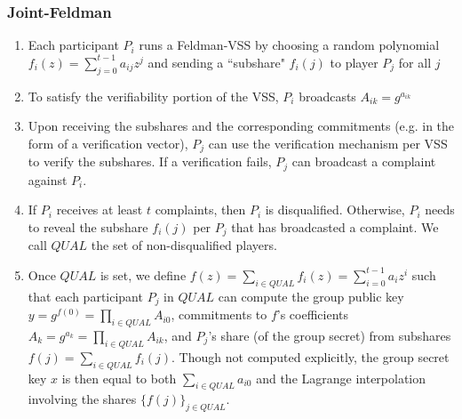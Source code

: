 \documentclass[11pt]{article}
\theoremstyle{definition}
\theoremstyle{remark}
\begin{document}
\subsubsection{Joint-Feldman}
\begin{enumerate}
\item Each participant $P_i$ runs a Feldman-VSS by choosing a random polynomial $f_i(z) = \sum_{j = 0}^{t - 1} a_{ij} z^j$ and sending a ``subshare" $f_i(j)$ to player $P_j$ for all $j$
\item To satisfy the verifiability portion of the VSS, $P_i$ broadcasts $A_{ik} = g^{a_{ik}}$
\item Upon receiving the subshares and the corresponding commitments (e.g. in the form of a verification vector), $P_j$ can use the verification mechanism per VSS to verify the subshares. If a verification fails, $P_j$ can broadcast a complaint against $P_i$.
\item If $P_i$ receives at least $t$ complaints, then $P_i$ is disqualified. Otherwise, $P_i$ needs to reveal the subshare $f_i(j)$ per $P_j$ that has broadcasted a complaint. We call $QUAL$ the set of non-disqualified players.
\item Once $QUAL$ is set, we define $f(z) = \sum_{i \in QUAL} f_i(z) = \sum_{i = 0}^{t - 1} a_i z^i$ such that each participant $P_j$ in $QUAL$ can compute the group public key $y = g^{f(0)} = \prod_{i \in QUAL} A_{i0}$, commitments to $f$'s coefficients $A_k = g^{a_k} = \prod_{i \in QUAL} A_{ik}$, and $P_j$'s share (of the group secret) from subshares $f(j) = \sum_{i \in QUAL} f_i(j)$. Though not computed explicitly, the group secret key $x$ is then equal to both $\sum_{i \in QUAL} a_{i0}$ and the Lagrange interpolation involving the shares $\{f(j)\}_{j \in QUAL}$.
\end{enumerate}

\end{document}
